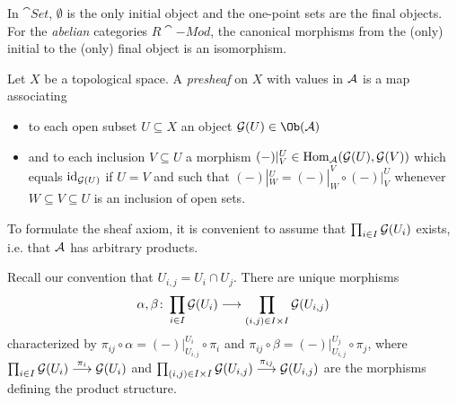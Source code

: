 \documentclass[a4paper,parskip=half,numbers=enddot, DIV=12]{scrreprt}
\begin{document}
  \begin{rem*}
  	In $\cat{Set}$, $\emptyset$ is the only initial object and the one-point sets are the final objects. For the \emph{abelian} categories $R\cat{-Mod}$, the canonical morphisms from the (only) initial to the (only) final object is an isomorphism.
  \end{rem*}
	Let $X$ be a topological space. A \emph{presheaf} on $X$ with values in $\mathcal{A}$ is a map associating
	\begin{itemize}
		\item to each open subset $U\subseteq X$ an object $\Gg(U)\in\Ob(\Aa)$
		\item and to each inclusion $V\subseteq U$ a morphism $(-)|_V^U\in\operatorname{Hom}_{\mathcal{A}}(\mathcal{G}(U), \mathcal{G}(V))$ which equals $\operatorname{id}_{\mathcal{G}(U)}$ if $U=V$ and such that $(-)|_W^U=(-)|_W^V\circ(-)|_V^U$ whenever $W\subseteq V\subseteq U$ is an inclusion of open sets.
	\end{itemize}
	To formulate the sheaf axiom, it is convenient to assume that $\prod_{i\in I}\mathcal{G}(U_i)$ exists, i.e. that $\mathcal{A}$ has arbitrary products.
	
	Recall our convention that $U_{i,j}=U_i\cap U_j$. There are unique morphisms
	\begin{align*}
		\alpha,\beta\colon \prod_{i\in I}\mathcal{G}(U_i)\longrightarrow\prod_{(i,j)\in I\times I}\mathcal{G}(U_{i,j})
	\end{align*}
	characterized by $\pi_{ij}\circ\alpha=(-)|_{U_{i,j}}^{U_i}\circ\pi_i$ and $\pi_{ij}\circ\beta=(-)|_{U_{i,j}}^{U_j}\circ\pi_j$, where $\prod_{i\in I}\Gg(U_i)\morphism[\pi_i]\Gg(U_i)$ and $\prod_{(i,j)\in I\times I}\Gg(U_{i,j})\morphism[\pi_{ij}]\Gg(U_{i,j})$ are the morphisms defining the product structure.
	
\end{document}
